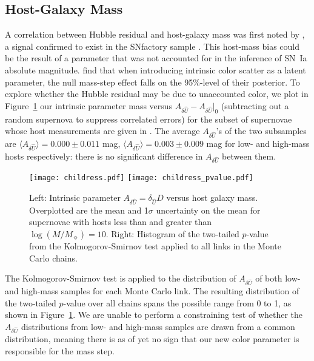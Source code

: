 \documentclass{aastex61}   	%
\begin{document}
\subsection{Host-Galaxy Mass}
A correlation between Hubble residual and host-galaxy mass
was first noted by \citet{2010ApJ...715..743K,2010MNRAS.406..782S}, a signal confirmed to exist in the SNfactory
sample \citep{2013ApJ...770..108C}.
This host-mass bias could be the result of a parameter that was not accounted for in the inference of SN~Ia absolute magnitude.
 find that when introducing intrinsic color scatter as a latent parameter, the null mass-step effect falls on the 95\%-level of their posterior.
To explore whether the Hubble residual may be due to unaccounted color,
we plot in Figure~\ref{childress:fig} our intrinsic parameter
mass versus $A_{\delta {\hat{U}}}-A_{\delta {\hat{U}}}|_0$  (subtracting out a random supernova
to suppress correlated errors)
for the subset of supernovae whose host measurements are given in \citet{2013ApJ...770..108C}.
The average $A_{\delta {\hat{U}}}$'s of the two subsamples are
$\langle A_{\delta {\hat{U}}} \rangle=   0.000 \pm {    0.011 }$ mag,
$\langle A_{\delta {\hat{U}}} \rangle= 0.003 \pm {    0.009 }$ mag
for low- and high-mass hosts respectively: there is no significant difference in $A_{\delta {\hat{U}}}$ between them. 


\begin{figure}[htbp] %
   \centering
   \texttt{[image: childress.pdf]}
   \texttt{[image: childress\_pvalue.pdf]}
      \caption{Left: Intrinsic parameter $A_{\delta {\hat{U}}}=\delta_{\hat{U}} D$  versus host galaxy mass. Overplotted are the mean and 1$\sigma$ uncertainty on the mean for supernovae with hosts
      less than and greater than  $\log{(M/M_\sun)}=10$.
Right: Histogram of the two-tailed $p$-value from  the Kolmogorov-Smirnov test applied to all links in the Monte Carlo chains.
   \label{childress:fig}}
\end{figure}


The Kolmogorov-Smirnov test is applied to the distribution of $A_{\delta {\hat{U}}}$ of both low- and high-mass samples for
each Monte Carlo link.  The resulting distribution of the two-tailed $p$-value  over all chains spans the possible range from 0 to 1, as shown in Figure~\ref{childress:fig}.  We are unable to perform a constraining test of whether the $A_{\delta {\hat{U}}}$ distributions from low- and high-mass samples
are drawn from a common distribution,
meaning there is as of yet no sign that our new color parameter is responsible for the mass step.
\end{document}

